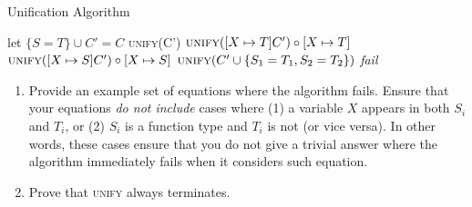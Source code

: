 \documentclass[11pt, oneside]{article}   	%
\begin{document}
\begin{algorithm}
\caption{Unification Algorithm}\label{alg:unify}
\begin{algorithmic}
 \Return [\ ]
\Else
  \State let $\{S = T\} \cup C' = C$
   \textsc{unify}(C')
    \State \Return $\textsc{unify}([X \mapsto T]C') \circ [X \mapsto T]$
   \State \Return $\textsc{unify}([X \mapsto S]C') \circ [X \mapsto S]$
    \State \Return $\textsc{unify}(C' \cup \{S_1 = T_1, S_2 = T_2\})$
  \Else \State \Return \emph{fail}
  \EndIf
\EndIf
\EndProcedure
\end{algorithmic}
\end{algorithm}
\begin{enumerate}[label=\bf\Alph*]

\item
  Provide an example set of equations where the algorithm fails.
  Ensure that your equations \emph{do not include}
   cases where (1) a variable $X$ appears in both $S_i$ and $T_i$,
  or (2) $S_i$ is a function type and $T_i$ is not (or vice versa).
  In other words, these cases ensure that you do not give a trivial
  answer where the algorithm immediately fails when it considers
  such equation.


\item Prove that \textsc{unify} always terminates.
\end{enumerate}
\end{document}
